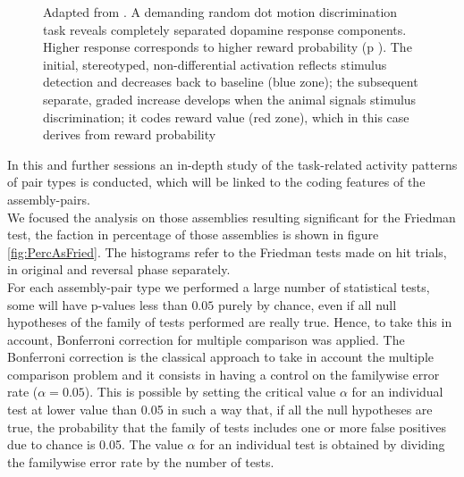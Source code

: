 \begin{figure}
    \caption{Adapted from \cite{Schultz2016}. A demanding random dot motion discrimination task reveals completely separated dopamine response components. Higher response corresponds to higher reward probability (p ). The initial, stereotyped, non-differential activation reflects stimulus detection and decreases back to baseline (blue zone); the subsequent separate, graded increase develops when the animal signals stimulus discrimination; it codes reward value (red zone), which in this case derives from reward probability}
    \label{fig:probSchultz}
\end{figure}%
In this and further sessions an in-depth study of the task-related activity patterns of pair types is conducted, which will be linked to the coding features of the assembly-pairs.\\
We focused the analysis on those assemblies resulting significant for the Friedman test, the faction in percentage of those assemblies is shown in figure \ref{fig:PercAsFried}. The histograms refer to the Friedman tests made on hit trials, in original and reversal phase separately.\\For each assembly-pair type we performed a large number of statistical tests, some will have p-values less than $0.05$ purely by chance, even if all null hypotheses of the family of tests performed are really true. Hence, to take this in account, Bonferroni correction for multiple comparison was applied. The Bonferroni correction is the classical approach to take in account the multiple comparison problem and it consists in having a control on the familywise error rate ($\alpha=0.05$). This is possible by setting the critical value $\alpha$ for an individual test at lower value than 0.05 in such a way that, if all the null hypotheses are true, the probability that the family of tests includes one or more false positives due to chance is 0.05. The value $\alpha$ for an individual test is obtained by dividing the familywise error rate by the number of tests.\\
